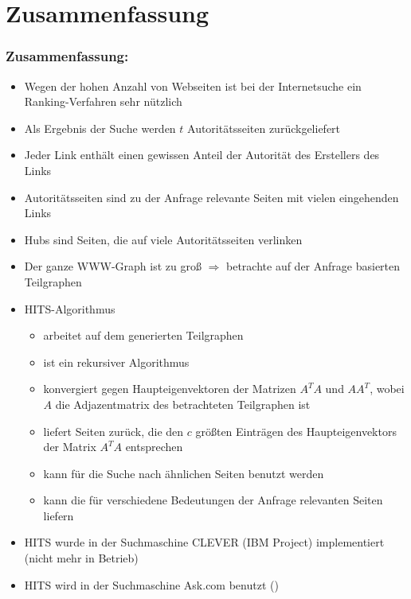 \documentclass[hyperref={pdfpagelabels=false}]{beamer}
\begin{document}


\section{Zusammenfassung}

\begin{frame}[allowframebreaks]
\frametitle{Zusammenfassung:}
\fontsize{9pt}{7.2}\selectfont
\begin{itemize}
	\item Wegen der hohen Anzahl von Webseiten ist bei der Internetsuche ein Ranking-Verfahren sehr nützlich 
	\item Als Ergebnis der Suche werden $t$ Autoritätsseiten zurückgeliefert
	\item Jeder Link enthält einen gewissen Anteil der Autorität des Erstellers des Links
	\item Autoritätsseiten sind zu der Anfrage relevante Seiten mit vielen eingehenden Links
	\item Hubs sind Seiten, die auf viele Autoritätsseiten verlinken
	\item Der ganze WWW-Graph ist zu groß $\Rightarrow$ betrachte auf der Anfrage basierten Teilgraphen
\end{itemize}

\framebreak


\begin{itemize}
\item HITS-Algorithmus
	\begin{itemize}
		\item arbeitet auf dem generierten Teilgraphen
		\item ist ein rekursiver Algorithmus
		\item konvergiert gegen Haupteigenvektoren der Matrizen $A^TA$ und $AA^T$, wobei $A$ die Adjazentmatrix des betrachteten Teilgraphen ist
		\item liefert Seiten zurück, die den $c$ größten Einträgen des Haupteigenvektors der Matrix $A^TA$ entsprechen
		\item kann für die Suche nach ähnlichen Seiten benutzt werden
		\item kann die für verschiedene Bedeutungen der Anfrage relevanten Seiten liefern
	\end{itemize}
\item HITS wurde in der Suchmaschine CLEVER (IBM Project) implementiert (nicht mehr in Betrieb)
\item HITS wird in der Suchmaschine Ask.com benutzt (\cite{HITS_Lecture4_Cornell})
\end{itemize}
\end{frame}
\end{document}
